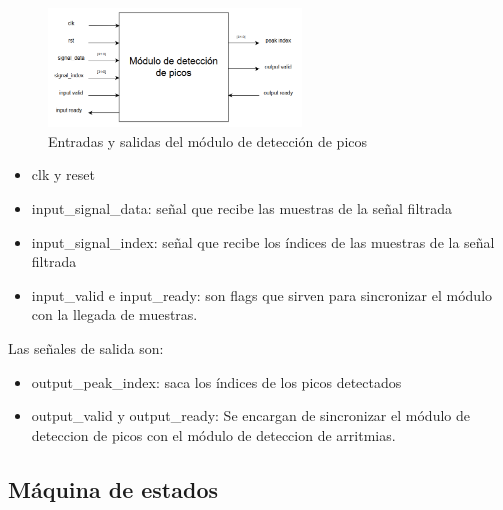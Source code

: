     \begin{figure}[h!]
        \centering
        \includegraphics[width=0.6\textwidth]{./Images/img_implementacion_hw/diagramamodulodeteccionpicos.png}
        \caption{Entradas y salidas del módulo de detección de picos}
        \label{fig:moddeteccionpicos}
    \end{figure} 
    
    \begin{itemize}
    \item clk y reset
    \item input\_signal\_data: señal que recibe las muestras de la señal filtrada 
    \item input\_signal\_index: señal que recibe los índices de las muestras de la señal filtrada 
    \item input\_valid e input\_ready: son flags que sirven para sincronizar el módulo con la llegada de muestras. 
    \end{itemize}
    
    Las señales de salida son:
    
    \begin{itemize}
        \item output\_peak\_index: saca los índices de los picos detectados
        \item output\_valid y output\_ready: Se encargan de sincronizar el módulo de deteccion de picos 
        con el módulo de deteccion de arritmias.
    \end{itemize}

\subsection{Máquina de estados}

